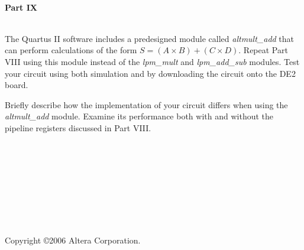 \documentclass[psfig,10pt,fullpage]{article}
\begin{document}
~\\
\noindent
{\bf Part IX}

~\\
\noindent
The Quartus II software includes a predesigned module called {\it altmult\_add} that can
perform calculations of the form $S = (A \times B) + (C \times D)$. Repeat Part VIII using
this module instead of the {\it lpm\_mult} and {\it lpm\_add\_sub} modules. Test your
circuit using both simulation and by downloading the circuit onto the DE2 board.

Briefly describe how the implementation of your circuit differs when using the
{\it altmult\_add} module. Examine its performance both with and without the pipeline 
registers discussed in Part VIII.

~\\
~\\
~\\
~\\
~\\
~\\
~\\
~\\
Copyright \copyright 2006 Altera Corporation. 
\end{document}

